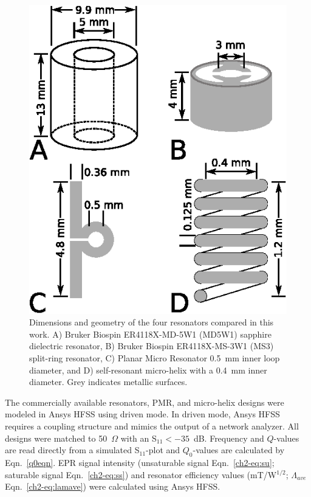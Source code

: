 \begin{figure}[htb]
\centering
 \includegraphics{Kapitel/Appendix/Images/S1-Geometries.eps}
 \caption[Geometries of resonators in this work.]{Dimensions and geometry of the four resonators compared in this work. A) Bruker Biospin ER4118X-MD-5W1 (MD5W1) sapphire dielectric resonator, B) Bruker Biospin ER4118X-MS-3W1 (MS3) split-ring resonator, C) Planar Micro Resonator 0.5~mm inner loop diameter, and D) self-resonant micro-helix with a 0.4~mm inner diameter. Grey indicates metallic surfaces.}
 \label{fig:geo}
\end{figure}

The commercially available resonators, PMR, and micro-helix designs were modeled in Ansys HFSS using driven mode. In driven mode, Ansys HFSS requires a coupling structure and mimics the output of a network analyzer. All designs were matched to 50~$\Omega$ with an S$_{11} < -35$~dB. Frequency and $Q$-values are read directly from a simulated S$_{11}$-plot and $Q_0$-values are calculated by Eqn.~\ref{q0eqn}. \cite{ginzton1957microwave} EPR signal intensity (unsaturable signal Eqn.~\ref{ch2-eq:su}; saturable signal Eqn.~\ref{ch2-eq:ss}) and resonator efficiency values (mT/W$^{1/2}$; $\Lambda_{ave}$ Eqn.~\ref{ch2-eq:lamave}) were calculated using Ansys HFSS.\cite{misrabook}  

